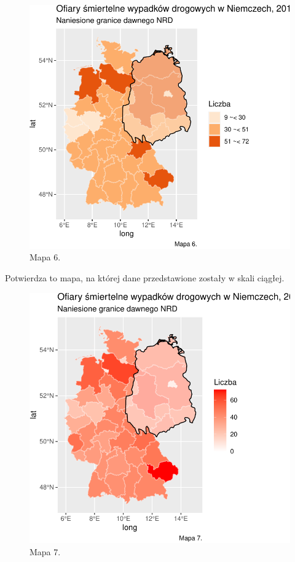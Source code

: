 \documentclass[
]{article}
\begin{document}
\begin{figure}

\includegraphics{raport_wypadki_files/figure-latex/unnamed-chunk-28-1} \hfill{}

\caption{Mapa 6.}\label{fig:unnamed-chunk-28}
\end{figure}

Potwierdza to mapa, na której dane przedstawione zostały w skali
ciągłej.

\begin{figure}

\includegraphics{raport_wypadki_files/figure-latex/unnamed-chunk-29-1} \hfill{}

\caption{Mapa 7.}\label{fig:unnamed-chunk-29}
\end{figure}
\end{document}
